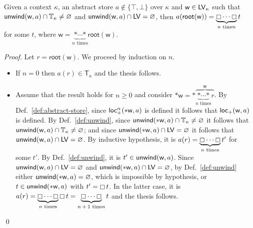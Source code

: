 \begin{lemma}\label{lem:unwind_no_leftvalues}
  Given a context $\kappa$, an abstract store $a\not\in\{\top,\bot\}$ over $\kappa$ and
  $\mathsf{w}\in\mathsf{LV}_\kappa$ such that
  $\mathsf{unwind}(\mathsf{w},a)\cap\mathbb{T}_\kappa\not=\varnothing$ and $\mathsf{unwind}(\mathsf{w},a)\cap\mathsf{LV}=\varnothing$,
  then $a(\mathsf{root}(\mathsf{w}))=\underbrace{\boxempty\cdots\boxempty}_\text{$n$ times}t$ for some $t$,
  where $\mathsf{w}=\underbrace{\mathtt{*}\cdots\mathtt{*}}_{\text{$n$ times}}\mathsf{root}(\mathsf{w})$.
\end{lemma}
\begin{proof}
  Let $r=\mathsf{root}(\mathsf{w})$. We proceed by induction on $n$.
  \begin{itemize}
  \item If $n=0$ then $a(r)\in\mathsf{T}_\kappa$ and the thesis follows.
  \item Assume that the result holds for $n\ge 0$ and consider
    $\mathtt{*}\mathsf{w}=\mathtt{*}\overbrace{\underbrace{\mathtt{*}\cdots\mathtt{*}}_{\text{$n$ times}} r}^\mathsf{w}$.
    By Def.~\ref{def:abstract-store}, since $\mathsf{loc_+^\alpha}(\mathtt{*}\mathsf{w},a)$ is defined it follows that $\mathsf{loc_+}(\mathsf{w},a)$ is defined.
    By Def.~\ref{def:unwind},
    since $\mathsf{unwind}(\mathtt{*}\mathsf{w},a)\cap\mathbb{T}_\kappa\not=\varnothing$ it follows that
    $\mathsf{unwind}(\mathsf{w},a)\cap\mathbb{T}_\kappa\not=\varnothing$;
    and since $\mathsf{unwind}(\mathtt{*}\mathsf{w},a)\cap\mathsf{LV}=\varnothing$ it follows that
    $\mathsf{unwind}(\mathsf{w},a)\cap\mathsf{LV}=\varnothing$.
    By inductive hypothesis, it is
    $a(r)=\underbrace{\boxempty\cdots\boxempty}_\text{$n$ times}t'$ for some $t'$.
    By Def.~\ref{def:unwind}, it is $t'\in\mathsf{unwind}(\mathsf{w},a)$.
    Since $\mathsf{unwind}(\mathsf{w},a)\cap\mathsf{LV}=\varnothing$ and
    $\mathsf{unwind}(\mathtt{*}\mathsf{w},a)\cap\mathsf{LV}=\varnothing$, by Def.~\ref{def:unwind}
    either $\mathsf{unwind}(\mathtt{*}\mathsf{w},a)=\varnothing$, which is impossible by hypothesis, or
    $t\in\mathsf{unwind}(\mathtt{*}\mathsf{w},a)$ with $t'=\boxempty\,{t}$. In the latter case, it is
    $a(r)=\underbrace{\boxempty\cdots\boxempty}_\text{$n$ times}\boxempty\,{t}
    =\underbrace{\boxempty\cdots\boxempty}_\text{$n+1$ times}t$ and the thesis follows.
  \end{itemize}
  \qed
\end{proof}


